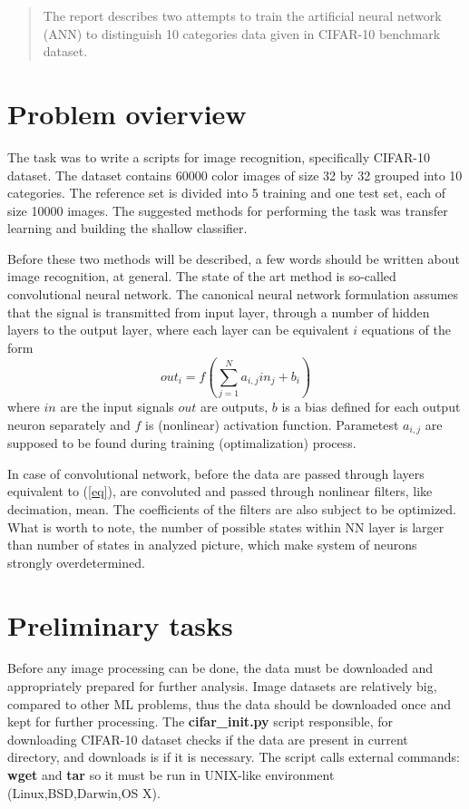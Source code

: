 \documentclass{article}
\begin{document}
\begin{abstract}
  The report describes two attempts to train
  the artificial neural network (ANN) to distinguish
  10 categories data given in CIFAR-10 benchmark dataset.
\end{abstract}

\section{Problem ovierview}

The task was to write a scripts for image recognition, specifically CIFAR-10 dataset.
The dataset contains 60000 color images of size 32 by 32 grouped into 10 categories.
The reference set is divided into 5 training and one test set, each of size 10000
images. The suggested methods for performing the task was transfer learning and
building the shallow classifier.

Before these two methods will be described, a few words should be written about
image recognition, at general. The state of the art method is so-called
convolutional neural network. The canonical neural network formulation assumes
that  the signal is transmitted from input layer, through a number of hidden layers
to the output layer, where each layer can be equivalent $i$ equations of the form
\begin{equation}
  \label{eq}
  out_i = f \left( \sum_{j=1}^{N} a_{i,j} in_j + b_i \right)
\end{equation}
where $in$ are the input signals $out$ are outputs, $b$ is a bias
defined for each output neuron separately and $f$ is (nonlinear)
activation function. Parametest $a_{i,j}$ are supposed to be found during training
(optimalization) process.

In case of convolutional network, before the data are passed through
layers equivalent to (\ref{eq}), are convoluted and passed through nonlinear
filters, like decimation, mean. The coefficients of the filters are also
subject to be optimized. What is worth to note, the number of possible states
within NN layer is larger than number of states in analyzed picture, which
make system of neurons strongly overdetermined.



\section{Preliminary tasks}

Before any image processing can be done, the data must be downloaded and appropriately prepared
for further analysis. Image datasets are relatively big, compared to other ML problems, thus
the data should be downloaded once and kept for further processing. The {\bf cifar\_init.py}
script responsible, for downloading CIFAR-10 dataset checks if the data are present in current directory, and downloads is if it is necessary. The script calls external commands: {\bf wget} and
{\bf tar} so it must be run in UNIX-like environment (Linux,BSD,Darwin,OS X).
\end{document}
